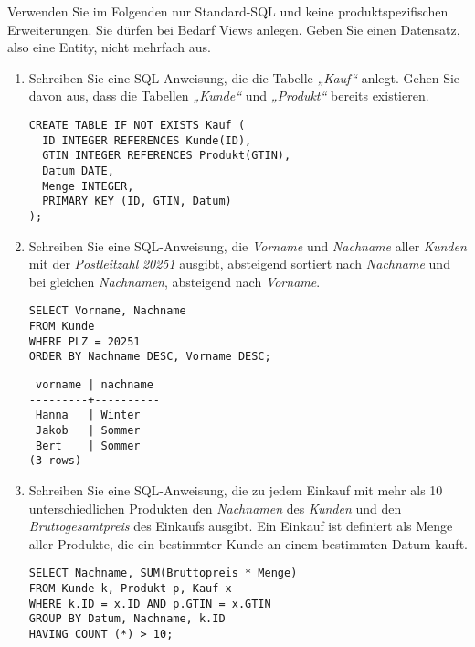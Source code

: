 \documentclass{bschlangaul-aufgabe}
\begin{document}
Verwenden Sie im Folgenden nur Standard-SQL und keine
produktspezifischen Erweiterungen. Sie dürfen bei Bedarf Views anlegen.
Geben Sie einen Datensatz, also eine Entity, nicht mehrfach aus.

\begin{enumerate}


\item Schreiben Sie eine SQL-Anweisung, die die Tabelle \emph{„Kauf“}
anlegt. Gehen Sie davon aus, dass die Tabellen \emph{„Kunde“} und
\emph{„Produkt“} bereits existieren.

\begin{bAntwort}
\begin{verbatim}
CREATE TABLE IF NOT EXISTS Kauf (
  ID INTEGER REFERENCES Kunde(ID),
  GTIN INTEGER REFERENCES Produkt(GTIN),
  Datum DATE,
  Menge INTEGER,
  PRIMARY KEY (ID, GTIN, Datum)
);
\end{verbatim}
\end{bAntwort}


\item Schreiben Sie eine SQL-Anweisung, die \emph{Vorname} und
\emph{Nachname} aller \emph{Kunden} mit der \emph{Postleitzahl}
\emph{20251} ausgibt, absteigend sortiert nach \emph{Nachname} und bei
gleichen \emph{Nachnamen}, absteigend nach \emph{Vorname}.

\begin{bAntwort}
\begin{verbatim}
SELECT Vorname, Nachname
FROM Kunde
WHERE PLZ = 20251
ORDER BY Nachname DESC, Vorname DESC;
\end{verbatim}

\begin{verbatim}
 vorname | nachname
---------+----------
 Hanna   | Winter
 Jakob   | Sommer
 Bert    | Sommer
(3 rows)
\end{verbatim}
\end{bAntwort}


\item Schreiben Sie eine SQL-Anweisung, die zu jedem Einkauf mit mehr
als 10 unterschiedlichen Produkten den \emph{Nachnamen} des
\emph{Kunden} und den \emph{Bruttogesamtpreis} des Einkaufs ausgibt. Ein
Einkauf ist definiert als Menge aller Produkte, die ein bestimmter Kunde
an einem bestimmten Datum kauft.

\begin{bAntwort}
\begin{verbatim}
SELECT Nachname, SUM(Bruttopreis * Menge)
FROM Kunde k, Produkt p, Kauf x
WHERE k.ID = x.ID AND p.GTIN = x.GTIN
GROUP BY Datum, Nachname, k.ID
HAVING COUNT (*) > 10;
\end{verbatim}


\end{bAntwort}
\end{enumerate}
\end{document}
